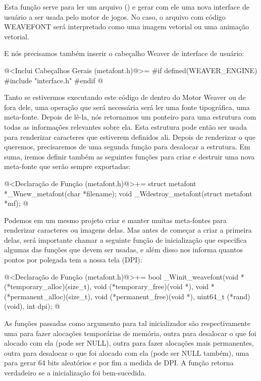 Esta função serve para ler um arquivo ()
e gerar com ele uma nova interface de usuário a ser usada pelo motor
de jogos. No caso, o arquivo com código WEAVEFONT será interpretado
como uma imagem vetorial ou uma animação vetorial.

E nós precisamos também inserir o cabeçalho Weaver de interface de usuário:

\iniciocodigo
@<Inclui Cabeçalhos Gerais (metafont.h)@>=
#if defined(WEAVER_ENGINE)
#include "interface.h"
#endif
@
\fimcodigo

Tanto se estivermos executando este código de dentro do Motor Weaver
ou de fora dele, uma operação que será necessária será ler uma fonte
tipográfica, uma meta-fonte. Depois de lê-la, nós retornamos um
ponteiro para uma estrutura com todas as informações relevantes sobre
ela. Esta estrutura pode então ser usada para renderizar caracteres
que estiverem definidos ali. Depois de renderizar o que queremos,
precisaremos de uma segunda função para desalocar a estrutura. Em
suma, iremos definir também as seguintes funções para criar e destruir
uma nova meta-fonte que serão sempre exportadas:

\iniciocodigo
@<Declaração de Função (metafont.h)@>+=
struct metafont *_Wnew_metafont(char *filename);
void _Wdestroy_metafont(struct metafont *mf);
@
\fimcodigo

Podemos em um mesmo projeto criar e manter muitas meta-fontes para
renderizar caracteres ou imagens delas. Mas antes de começar a criar a
primeira delas, será importante chamar a seguinte função de
inicialização que especifica algumas das funções que devem ser usadas,
e além disso nos informa quantos pontos por polegada tem a nossa tela
(DPI):

\iniciocodigo
@<Declaração de Função (metafont.h)@>+=
bool _Winit_weavefont(void *(*temporary_alloc)(size_t),
                     void (*temporary_free)(void *),
                     void *(*permanent_alloc)(size_t),
                     void (*permanent_free)(void *),
                     uint64_t (*rand)(void), int dpi);
@
\fimcodigo

As funções passadas como argumento para tal inicializador são
respectivamente uma para fazer alocações temporárias de memória, outra
para desalocar o que foi alocado com ela (pode ser NULL), outra para
fazer alocações mais permanentes, outra para desalocar o que foi
alocado com ela (pode ser NULL também), uma para gerar 64 bits
aleatórios e por fim a medida de DPI. A função retorna verdadeiro se a
inicialização foi bem-sucedida.

